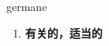 
\begin{frame}
{\huge germane}
\begin{center}
\begin{enumerate}\Large
  \item \textbf{有关的，适当的}
\end{enumerate}
\end{center}
\end{frame}
